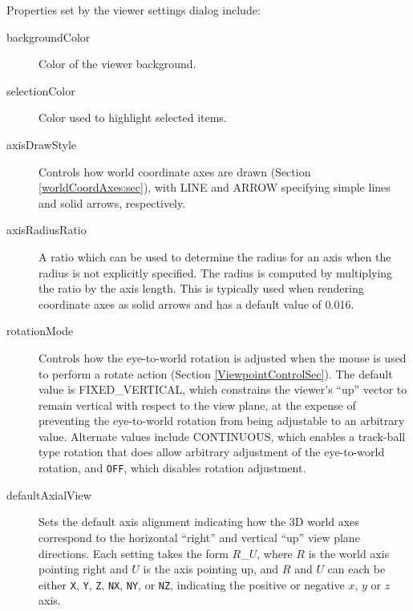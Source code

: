 \documentclass{article}
\begin{document}
Properties set by the viewer settings dialog include:

\begin{description}

\item[backgroundColor]\mbox{}

Color of the viewer background.

\item[selectionColor]\mbox{}

Color used to highlight selected items.

\item[axisDrawStyle]\mbox{}

Controls how world coordinate axes are drawn (Section
\ref{worldCoordAxes:sec}), with {\sf LINE} and {\sf ARROW} specifying
simple lines and solid arrows, respectively.

\item[axisRadiusRatio]\mbox{}

A ratio which can be used to determine the radius for an axis when the
radius is not explicitly specified. The radius is computed by
multiplying the ratio by the axis length. This is typically used when
rendering coordinate axes as solid arrows and has a default value of
0.016.

\item[rotationMode]\mbox{}

Controls how the eye-to-world rotation is adjusted when the mouse is
used to perform a rotate action (Section \ref{ViewpointControlSec}).
The default value is {\sf FIXED\_VERTICAL}, which constrains the
viewer's ``up'' vector to remain vertical with respect to the view
plane, at the expense of preventing the eye-to-world rotation from
being adjustable to an arbitrary value. Alternate values include {\sf
CONTINUOUS}, which enables a track-ball type rotation that does allow
arbitrary adjustment of the eye-to-world rotation, and {\tt OFF},
which disables rotation adjustment.

\item[defaultAxialView]\mbox{}

Sets the default axis alignment indicating how the 3D world axes
correspond to the horizontal ``right'' and vertical ``up'' view plane
directions.  Each setting takes the form $R$\_$U$, where $R$ is the
world axis pointing right and $U$ is the axis pointing up, and $R$ and
$U$ can each be either {\tt X}, {\tt Y}, {\tt Z}, {\tt NX}, {\tt NY},
or {\tt NZ}, indicating the positive or negative $x$, $y$ or $z$ axis.


\end{description}
\end{document}
